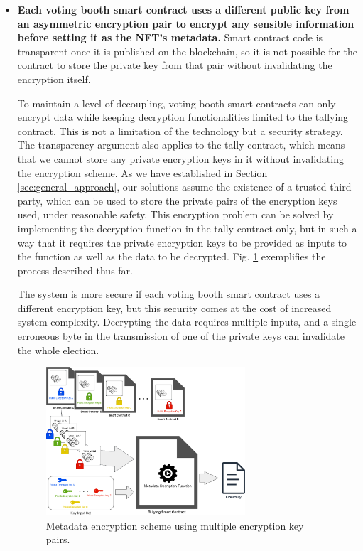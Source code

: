 \documentclass[./4_GeneralApproach.tex]{subfiles}
\begin{document}
\begin{itemize}
    \item{\textbf{Each voting booth smart contract uses a different public key from an asymmetric encryption pair to encrypt any sensible information before setting it as the NFT's metadata.} Smart contract code is transparent once it is published on the blockchain, so it is not possible for the contract to store the private key from that pair without invalidating the encryption itself.
          \par
          To maintain a level of decoupling, voting booth smart contracts can only encrypt data while keeping decryption functionalities limited to the tallying contract. This is not a limitation of the technology but a security strategy. The transparency argument also applies to the tally contract, which means that we cannot store any private encryption keys in it without invalidating the encryption scheme. As we have established in Section \ref{sec:general_approach}, our solutions assume the existence of a trusted third party, which can be used to store the private pairs of the encryption keys used, under reasonable safety. This encryption problem can be solved by implementing the decryption function in the tally contract only, but in such a way that it requires the private encryption keys to be provided as inputs to the function as well as the data to be decrypted. Fig. \ref{fig:multiple_encryption_key_scheme} exemplifies the process described thus far.
          \par
          The system is more secure if each voting booth smart contract uses a different encryption key, but this security comes at the cost of increased system complexity. Decrypting the data requires multiple inputs, and a single erroneous byte in the transmission of one of the private keys can invalidate the whole election.}

          \begin{figure}[htp]
              \centering
              \includegraphics[width=0.7\textwidth]{../Images/ContractBasedSolution_encryption1.png}
              \caption{Metadata encryption scheme using multiple encryption key pairs.}
              \label{fig:multiple_encryption_key_scheme}
          \end{figure}


\end{itemize}
\end{document}

